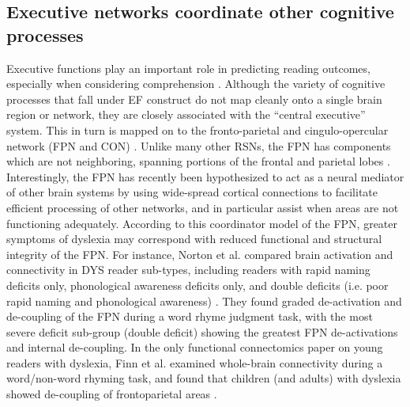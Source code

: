 \subsection{Executive networks coordinate other cognitive processes} 
Executive functions play an important role in predicting reading outcomes, especially when considering comprehension \citep{Cutting2009a}. Although the variety of cognitive processes that fall under EF construct do not map cleanly onto a single brain region or network, they are closely associated with the ``central executive'' system. This in turn is mapped on to the fronto-parietal and cingulo-opercular network (FPN and CON) \citep{Fedorenko2014a, Cocchi2013}. Unlike many other RSNs, the FPN has components which are not neighboring, spanning portions of the frontal and parietal lobes \citep{Yeo2011}. Interestingly, the FPN has recently been hypothesized to act as a neural mediator of other brain systems \citep{Menon2010, Cole2014} by using wide-spread cortical connections to facilitate efficient processing of other networks, and in particular assist when areas are not functioning adequately. According to this coordinator model of the FPN, greater symptoms of dyslexia may correspond with reduced functional and structural integrity of the FPN. For instance, Norton et al. compared brain activation and connectivity in DYS reader sub-types, including readers with rapid naming deficits only, phonological awareness deficits only, and double deficits (i.e. poor rapid naming and phonological awareness) \citep{Norton2014}. They found graded de-activation and de-coupling of the FPN during a word rhyme judgment task, with the most severe deficit sub-group (double deficit) showing the greatest FPN de-activations and internal de-coupling. In the only functional connectomics paper on young readers with dyslexia, Finn et al. examined whole-brain connectivity during a word/non-word rhyming task, and found that children (and adults) with dyslexia showed de-coupling of frontoparietal areas \citep{Finn2014}. 


